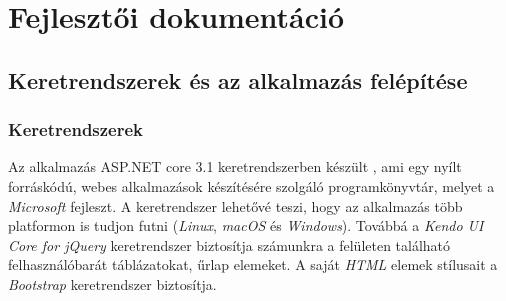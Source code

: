\chapter{Fejlesztői dokumentáció} %
\label{ch:developer}

\section{Keretrendszerek és az alkalmazás felépítése}
\label{sec:framework-app}
\subsection{Keretrendszerek}
\label{subsec:framework}
Az alkalmazás ASP.NET core 3.1 keretrendszerben készült \cite{ASPDOTNETCORE3_1}, ami egy nyílt forráskódú, webes alkalmazások készítésére szolgáló programkönyvtár, melyet a \emph{Microsoft} fejleszt. A keretrendszer lehetővé teszi, hogy az alkalmazás több platformon is tudjon futni (\emph{Linux}, \emph{macOS} és \emph{Windows}). Továbbá a \emph{Kendo UI Core for jQuery}\cite{KendoUIforJquery} keretrendszer biztosítja számunkra a felületen található felhasználóbarát táblázatokat, űrlap elemeket. A saját \emph{HTML} elemek stílusait a \emph{Bootstrap}\cite{Bootstrap} keretrendszer biztosítja.
